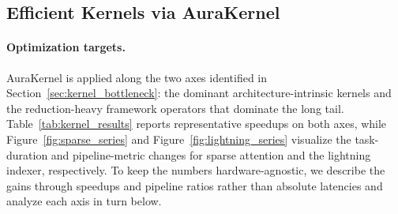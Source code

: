 \subsection{Efficient Kernels via AuraKernel}
\label{subsec:eval_aurakernel}

\paragraph{Optimization targets.}
AuraKernel is applied along the two axes identified in Section~\ref{sec:kernel_bottleneck}: the dominant architecture-intrinsic kernels and the reduction-heavy framework operators that dominate the long tail. Table~\ref{tab:kernel_results} reports representative speedups on both axes, while Figure~\ref{fig:sparse_series} and Figure~\ref{fig:lightning_series} visualize the task-duration and pipeline-metric changes for sparse attention and the lightning indexer, respectively. To keep the numbers hardware-agnostic, we describe the gains through speedups and pipeline ratios rather than absolute latencies and analyze each axis in turn below.
\begin{table}[h]
\centering
\caption{Representative operators optimized by AuraKernel on Ascend 910C, reported as single-operator task duration. The sparse-attention forward and backward and the sparse lightning-indexer gradient are per-invocation durations measured in the end-to-end training context at two compression ratios (for the indexer, cmp.\ ratio $0$ is the full CFA path with RoPE and softmax, cmp.\ ratio $4$ is the SCFA path); the RMS-normalization kernels are measured at the operator level ($tp{=}2$, input $[B{\cdot}S{=}8192,\,H{=}64,\,D{=}512]$, BF16). Speedup is baseline/optimized.}
\label{tab:kernel_results}
\end{table}


